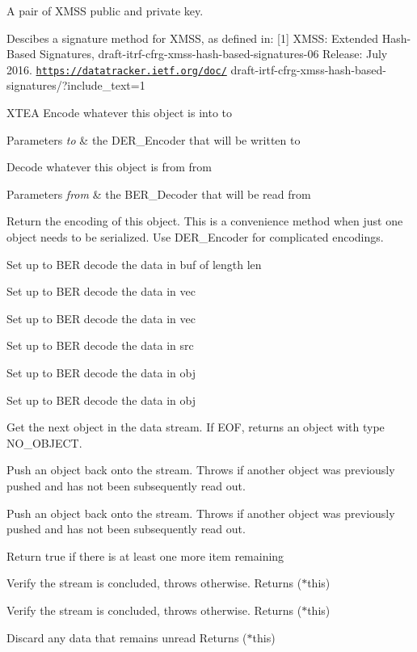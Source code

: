 A pair of X\+M\+SS public and private key.

Descibes a signature method for X\+M\+SS, as defined in\+: \mbox{[}1\mbox{]} X\+M\+SS\+: Extended Hash-\/\+Based Signatures, draft-\/itrf-\/cfrg-\/xmss-\/hash-\/based-\/signatures-\/06 Release\+: July 2016. \href{https://datatracker.ietf.org/doc/}{\tt https\+://datatracker.\+ietf.\+org/doc/} draft-\/irtf-\/cfrg-\/xmss-\/hash-\/based-\/signatures/?include\+\_\+text=1

X\+T\+EA Encode whatever this object is into to 
\begin{DoxyParams}{Parameters}
{\em to} & the D\+E\+R\+\_\+\+Encoder that will be written to\\
\hline
\end{DoxyParams}
Decode whatever this object is from from 
\begin{DoxyParams}{Parameters}
{\em from} & the B\+E\+R\+\_\+\+Decoder that will be read from\\
\hline
\end{DoxyParams}
Return the encoding of this object. This is a convenience method when just one object needs to be serialized. Use D\+E\+R\+\_\+\+Encoder for complicated encodings.

Set up to B\+ER decode the data in buf of length len

Set up to B\+ER decode the data in vec

Set up to B\+ER decode the data in vec

Set up to B\+ER decode the data in src

Set up to B\+ER decode the data in obj

Set up to B\+ER decode the data in obj

Get the next object in the data stream. If E\+OF, returns an object with type N\+O\+\_\+\+O\+B\+J\+E\+CT.

Push an object back onto the stream. Throws if another object was previously pushed and has not been subsequently read out.

Push an object back onto the stream. Throws if another object was previously pushed and has not been subsequently read out.

Return true if there is at least one more item remaining

Verify the stream is concluded, throws otherwise. Returns ($\ast$this)

Verify the stream is concluded, throws otherwise. Returns ($\ast$this)

Discard any data that remains unread Returns ($\ast$this)

